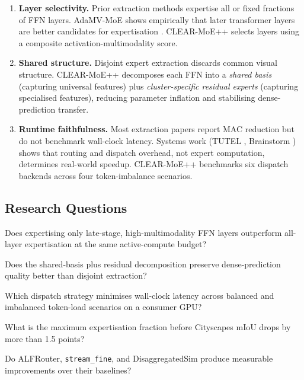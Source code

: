 \documentclass[12pt,a4paper]{article}
\begin{document}
\begin{enumerate}
\item \textbf{Layer selectivity.} Prior extraction methods expertise all or fixed fractions of FFN layers. AdaMV-MoE shows empirically that later transformer layers are better candidates for expertisation \cite{chen2023adamvmoe}. CLEAR-MoE++ selects layers using a composite activation-multimodality score.

\item \textbf{Shared structure.} Disjoint expert extraction discards common visual structure. CLEAR-MoE++ decomposes each FFN into a \emph{shared basis} (capturing universal features) plus \emph{cluster-specific residual experts} (capturing specialised features), reducing parameter inflation and stabilising dense-prediction transfer.

\item \textbf{Runtime faithfulness.} Most extraction papers report MAC reduction but do not benchmark wall-clock latency. Systems work (TUTEL \cite{hwang2023tutel}, Brainstorm \cite{brainstorm2023}) shows that routing and dispatch overhead, not expert computation, determines real-world speedup. CLEAR-MoE++ benchmarks six dispatch backends across four token-imbalance scenarios.
\end{enumerate}

\subsection{Research Questions}

\begin{description}[leftmargin=1.5em]
\item[RQ1 (Layer selectivity)] Does expertising only late-stage, high-multimodality FFN layers outperform all-layer expertisation at the same active-compute budget?
\item[RQ2 (Shared basis)] Does the shared-basis plus residual decomposition preserve dense-prediction quality better than disjoint extraction?
\item[RQ3 (Runtime)] Which dispatch strategy minimises wall-clock latency across balanced and imbalanced token-load scenarios on a consumer GPU?
\item[RQ4 (Transfer)] What is the maximum expertisation fraction before Cityscapes mIoU drops by more than 1.5 points?
\item[RQ5 (Novel modules)] Do ALFRouter, \texttt{stream\_fine}, and DisaggregatedSim produce measurable improvements over their baselines?
\end{description}
\end{document}

